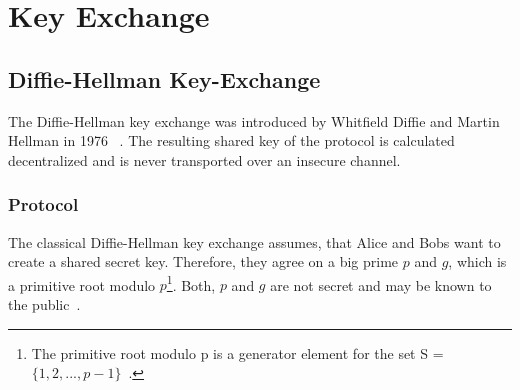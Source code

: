 \section{Key Exchange}
\subsection{Diffie-Hellman Key-Exchange}

The Diffie-Hellman key exchange was introduced by Whitfield Diffie and Martin Hellman in 1976 ~\parencite{diffie1976new}. The resulting shared key of the protocol is calculated decentralized and is never transported over an insecure channel.

\subsubsection{Protocol}
The classical Diffie-Hellman key exchange assumes, that Alice and Bobs want to create a shared secret key. Therefore, they agree on a big prime $p$ and $g$, which is a primitive root modulo $p$\footnote{The primitive root modulo p is a generator element for the set S = $\{1, 2, ... , p-1\}$~\parencite{ITSicherheit}.}. Both, $p$ and $g$ are not secret and may be known to the public~\parencite{watjen2018kryptographie}.

